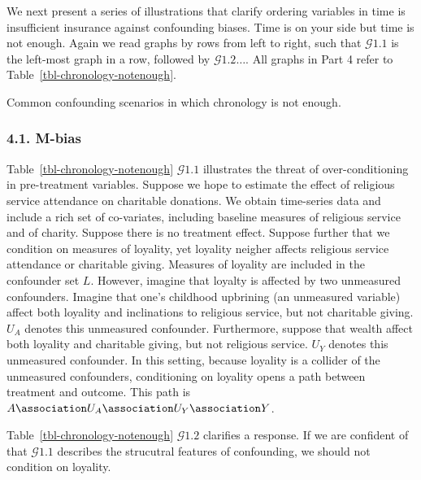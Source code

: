 \documentclass[
  single column]{article}
\begin{document}
We next present a series of illustrations that clarify ordering
variables in time is insufficient insurance against confounding biases.
Time is on your side but time is not enough. Again we read graphs by
rows from left to right, such that \(\mathcal{G} 1.1\) is the left-most
graph in a row, followed by \(\mathcal{G} 1.2 \ldots\). All graphs in
Part 4 refer to Table~\ref{tbl-chronology-notenough}.

\begin{table}

\caption{\label{tbl-chronology-notenough}Common confounding scenarios in
which chronology is not enough.}

\centering{

\terminologychronologicalhygeineNOTENOUGH

}

\end{table}%

\subsubsection{4.1. M-bias}\label{m-bias}

Table~\ref{tbl-chronology-notenough} \(\mathcal{G} 1.1\) illustrates the
threat of over-conditioning in pre-treatment variables. Suppose we hope
to estimate the effect of religious service attendance on charitable
donations. We obtain time-series data and include a rich set of
co-variates, including baseline measures of religious service and of
charity. Suppose there is no treatment effect. Suppose further that we
condition on measures of loyality, yet loyality neigher affects
religious service attendance or charitable giving. Measures of loyality
are included in the confounder set \(L\). However, imagine that loyalty
is affected by two unmeasured confounders. Imagine that one's childhood
upbrining (an unmeasured variable) affect both loyality and inclinations
to religious service, but not charitable giving. \(U_A\) denotes this
unmeasured confounder. Furthermore, suppose that wealth affect both
loyality and charitable giving, but not religious service. \(U_Y\)
denotes this unmeasured confounder. In this setting, because loyality is
a collider of the unmeasured confounders, conditioning on loyality opens
a path between treatment and outcome. This path is
\(A\association U_A \association U_Y \association Y\).

Table~\ref{tbl-chronology-notenough} \(\mathcal{G} 1.2\) clarifies a
response. If we are confident of that \(\mathcal{G} 1.1\) describes the
strucutral features of confounding, we should not condition on loyality.
\end{document}
